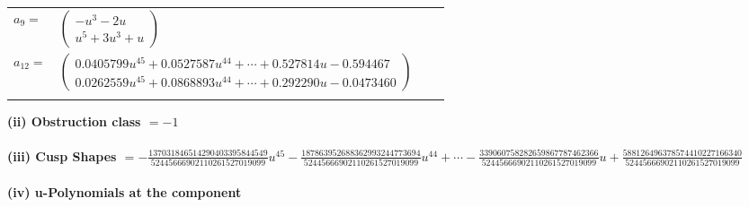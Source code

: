 \documentclass[1p]{elsarticle_modified}
\theoremstyle{definition}
\begin{document}
\begin{tabular}{m{7pt} m{180pt} m{7pt} m{180pt} }
\flushright $a_{9}=$&$\begin{pmatrix}- u^3-2 u\\u^5+3 u^3+u\end{pmatrix}$ \\
\flushright $a_{12}=$&$\begin{pmatrix}0.0405799 u^{45}+0.0527587 u^{44}+\cdots+0.527814 u-0.594467\\0.0262559 u^{45}+0.0868893 u^{44}+\cdots+0.292290 u-0.0473460\end{pmatrix}$\\&\end{tabular}
\flushleft \textbf{(ii) Obstruction class $= -1$}\\~\\
\flushleft \textbf{(iii) Cusp Shapes $= -\frac{137031846514290403395844549}{52445666902110261527019099} u^{45}-\frac{187863952688362993244773694}{52445666902110261527019099} u^{44}+\cdots-\frac{339060758282659867787462366}{52445666902110261527019099} u+\frac{588126496378574410227166340}{52445666902110261527019099}$}\\~\\
\newpage\renewcommand{\arraystretch}{1}
\flushleft \textbf{(iv) u-Polynomials at the component}\newline \\
\end{document}
